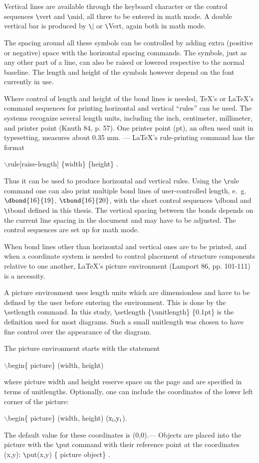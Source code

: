  Vertical lines are available through the keyboard character or the
 control sequences \verb+\+vert and \verb+\+mid, all three to be
 entered in math mode.
 A double vertical bar is produced by \verb+\+$|$ or \verb+\+Vert,
 again both in math mode.

 The spacing around all these symbols can be controlled by adding 
 extra (positive or negative) space with the horizontal spacing
 commands. The symbols, just as any other part of a line, can also
 be raised or lowered respective to the normal baseline. The length
 and height of the symbols however depend on the font currently 
 in use.

 Where control of length and height of the bond lines is needed,
 TeX's or LaTeX's command sequences for printing horizontal and 
 vertical ``rules'' can be used.  The systems recognize several
 length units, including the inch, centimeter, millimeter, and
 printer point (Knuth 84, p. 57). One printer point (pt), an often
 used unit in typesetting, measures about 0.35 mm. --- LaTeX's
 rule-printing command has the format \\                    
 \centerline{$\backslash $rule[raise-length] \{width\}
 \{height\} . }
 Thus it can be used to produce horizontal and vertical rules.
 Using the \verb+\+rule command one can also print multiple
 bond lines of user-controlled length, e.~g.  $\dbond{16}{19} $,
 $\tbond{16}{20} $, with the short control sequences \verb+\+dbond
 and \verb+\+tbond defined in this thesis. The vertical spacing
 between the bonds depends on the current line spacing in the
 document and may have to be adjusted. The control sequences
 are set up for math mode.
 
 When bond lines other than horizontal and vertical ones are to
 be printed, and when a coordinate system is needed to control
 placement of structure components relative to one another, 
 LaTeX's picture environment (Lamport 86, pp. 101-111) is a
 necessity. 

 A picture environment uses length units which are dimensionless
 and have to be defined by the user before entering the 
 environment. This is done by the \verb+\+setlength command.
 In this study, \verb+\+setlength \{\verb+\+unitlength\}  
 \{0.1pt\} is the definition used for most diagrams. Such a small
 unitlength was chosen to have fine control over the appearance
 of the diagram.

 The picture environment starts with the statement\\
 \centerline{$\backslash $begin\{ picture\} (width, height) }
 where picture width and height reserve space on the page 
 and are specified in terms of unitlengths. Optionally, one
 can include the coordinates of the lower left corner of the
 picture: \\
 \centerline{$\backslash $begin\{ picture\} (width, height)
 (${\rm x_i\mbox{,}y_i}$).}
 The default value for these coordinates is (0,0).---
 Objects are placed into the picture with the \verb+\+put
 command with their reference point at the coordinates (x,y):    
 \verb+\+put(x,y) \{ picture object\} .

